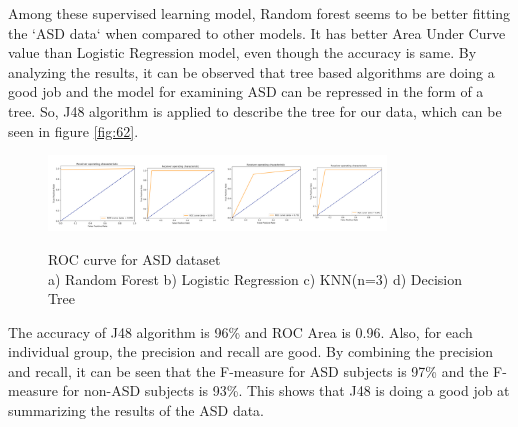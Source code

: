 Among these supervised learning model, Random forest seems to be better fitting the `ASD data` when compared to other models. It has better Area Under Curve value than Logistic Regression model, even though the accuracy is same. By analyzing the results, it can be observed that tree based algorithms are doing a good job and the model for examining ASD can be repressed in the form of a tree. So, J48 algorithm is applied to describe the tree for our data, which can be seen in figure \ref{fig:62}.
\begin{figure}
\centering
  {\includegraphics[width=0.8\textwidth]{Figures/Figure_6_1.png}}
  \caption{ ROC curve for ASD dataset \\a) Random Forest b) Logistic Regression c) KNN(n=3) d) Decision Tree }
  \label{fig:61}
\end{figure}
The accuracy of J48 algorithm is 96\% and ROC Area is 0.96. Also, for each individual group, the precision and recall are good. By combining the precision and recall, it can be seen that the F-measure for ASD subjects is 97\% and the F-measure for non-ASD subjects is 93\%. This shows that J48 is doing a good job at summarizing the results of the ASD data.


